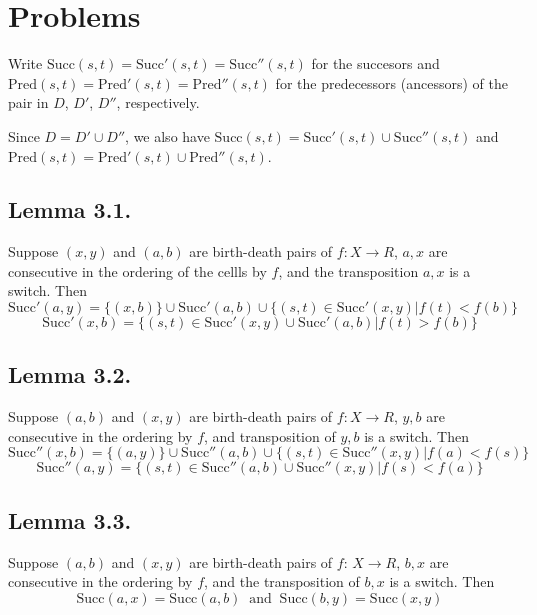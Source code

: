 \documentclass{article}
\begin{document}
\section{Problems}
\par Write $\text{Succ}(s, t) = \text{Succ}'(s, t) = \text{Succ}''(s, t)$ for the succesors and $\text{Pred}(s, t) = \text{Pred}'(s, t) = \text{Pred}''(s, t)$ for the predecessors (ancessors) of the pair in $D$, $D'$, $D''$, respectively.

\par Since $D = D' \cup D''$, we also have $\text{Succ}(s, t) = \text{Succ}'(s, t) \cup \text{Succ}''(s, t)$ and $\text{Pred}(s, t) = \text{Pred}'(s, t) \cup \text{Pred}''(s, t)$.

\subsection{Lemma 3.1.}
\par Suppose $(x, y)$ and $(a, b)$ are birth-death pairs of $f: X\to R$, $a, x$ are consecutive in the ordering of the cellls by $f$, and the transposition $a, x$ is a switch. Then
$$
\text{Succ}'(a, y) = \{(x, b)\} \cup \text{Succ}'(a, b) \cup \{(s, t)\in \text{Succ}'(x, y) | f(t)<f(b)\}
$$
$$
\text{Succ}'(x, b) = \{(s, t)\in \text{Succ}'(x, y) \cup \text{Succ}'(a, b) | f(t) > f(b)\}
$$

\subsection{Lemma 3.2.}
\par Suppose $(a, b)$ and $(x, y)$ are birth-death pairs of $f:X\to R$, $y, b$ are consecutive in the ordering by $f$, and transposition of $y, b$ is a switch. Then
$$
\text{Succ}''(x, b) = \{(a, y)\} \cup \text{Succ}''(a, b) \cup \{(s, t)\in \text{Succ}''(x, y) | f(a) < f(s)\}
$$
$$
\text{Succ}''(a, y) = \{(s, t)\in \text{Succ}''(a, b) \cup \text{Succ}''(x, y) | f(s) < f(a)\}
$$

\subsection{Lemma 3.3.}
\par Suppose $(a, b)$ and $(x, y)$ are birth-death pairs of $f$: $X\to R$, $b, x$ are consecutive in the ordering by $f$, and the transposition of $b, x$ is a switch. Then
$$
\text{Succ}(a, x) = \text{Succ}(a, b)
\;\;\text{and}\;\;
\text{Succ}(b, y) = \text{Succ}(x, y)
$$
\end{document}
